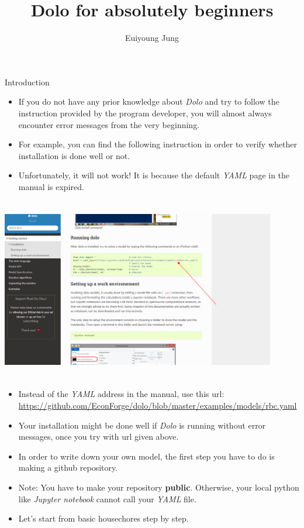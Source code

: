 \documentclass{beamer}
\title{Dolo for absolutely beginners}
\author{Euiyoung Jung}
\institute{PSE}
\date{} %
\begin{document}
{ 
\frame{\titlepage}}


\begin{frame}{Introduction}
    \begin{itemize}
        \item If you do not have any prior knowledge about \textit{Dolo} and try to follow the instruction provided by the program developer, you will almost always encounter error messages from the very beginning. 
        \item For example, you can find the following instruction in order to verify whether installation is done well or not. 
        \item Unfortunately, it will not work! It is because the default \textit{YAML} page in the manual is expired.
    \end{itemize}
    \end{frame}
\begin{frame}
     \includegraphics[width=12cm, height= 8cm]{dolo4.png} 
\end{frame}
\begin{frame}
    \begin{itemize}
    \item Instead of the \textit{YAML} address in the manual, use this url: \url{https://github.com/EconForge/dolo/blob/master/examples/models/rbc.yaml}  
    \item Your installation might be done well if \textit{Dolo} is running without error messages, once you try with url given above. 
        \item In order to write down your own model, the first step you have to do is making a github repository.
        \item Note: You have to make your repository \textbf{public}. Otherwise, your local python like \textit{Jupyter notebook} cannot call your \textit{YAML} file. 
        \item Let's start from basic housechores step by step. 
    \end{itemize}
\end{frame}
\end{document}
